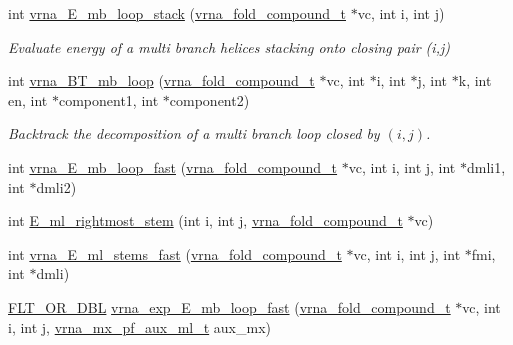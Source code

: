 \begin{DoxyCompactItemize}
int \mbox{\hyperlink{group__loops_ga73f048d35475e1d8f50b7d4ac6a2aeb6}{vrna\+\_\+\+E\+\_\+mb\+\_\+loop\+\_\+stack}} (\mbox{\hyperlink{group__fold__compound_ga1b0cef17fd40466cef5968eaeeff6166}{vrna\+\_\+fold\+\_\+compound\+\_\+t}} $\ast$vc, int i, int j)
\begin{DoxyCompactList}\small\item\em Evaluate energy of a multi branch helices stacking onto closing pair (i,j) \end{DoxyCompactList}\item 
int \mbox{\hyperlink{group__loops_ga9cb520ddfd8b3a48089a7910b045d06b}{vrna\+\_\+\+B\+T\+\_\+mb\+\_\+loop}} (\mbox{\hyperlink{group__fold__compound_ga1b0cef17fd40466cef5968eaeeff6166}{vrna\+\_\+fold\+\_\+compound\+\_\+t}} $\ast$vc, int $\ast$i, int $\ast$j, int $\ast$k, int en, int $\ast$component1, int $\ast$component2)
\begin{DoxyCompactList}\small\item\em Backtrack the decomposition of a multi branch loop closed by $ (i,j) $. \end{DoxyCompactList}\item 
int \mbox{\hyperlink{group__loops_gace56cf9c68e22ebfbeb4c04add4b03ca}{vrna\+\_\+\+E\+\_\+mb\+\_\+loop\+\_\+fast}} (\mbox{\hyperlink{group__fold__compound_ga1b0cef17fd40466cef5968eaeeff6166}{vrna\+\_\+fold\+\_\+compound\+\_\+t}} $\ast$vc, int i, int j, int $\ast$dmli1, int $\ast$dmli2)
\item 
int \mbox{\hyperlink{group__loops_gabe85e055e1e3245eaf108901473114ed}{E\+\_\+ml\+\_\+rightmost\+\_\+stem}} (int i, int j, \mbox{\hyperlink{group__fold__compound_ga1b0cef17fd40466cef5968eaeeff6166}{vrna\+\_\+fold\+\_\+compound\+\_\+t}} $\ast$vc)
\item 
int \mbox{\hyperlink{group__loops_ga806a455bf00a155dea7b0aa93d85c51b}{vrna\+\_\+\+E\+\_\+ml\+\_\+stems\+\_\+fast}} (\mbox{\hyperlink{group__fold__compound_ga1b0cef17fd40466cef5968eaeeff6166}{vrna\+\_\+fold\+\_\+compound\+\_\+t}} $\ast$vc, int i, int j, int $\ast$fmi, int $\ast$dmli)
\item 
\mbox{\hyperlink{group__data__structures_ga31125aeace516926bf7f251f759b6126}{F\+L\+T\+\_\+\+O\+R\+\_\+\+D\+BL}} \mbox{\hyperlink{group__loops_ga604313896e5f0ec91b6c44460707d036}{vrna\+\_\+exp\+\_\+\+E\+\_\+mb\+\_\+loop\+\_\+fast}} (\mbox{\hyperlink{group__fold__compound_ga1b0cef17fd40466cef5968eaeeff6166}{vrna\+\_\+fold\+\_\+compound\+\_\+t}} $\ast$vc, int i, int j, \mbox{\hyperlink{group__loops_ga39a8cc1385dcb542a60a9393cde6a1e3}{vrna\+\_\+mx\+\_\+pf\+\_\+aux\+\_\+ml\+\_\+t}} aux\+\_\+mx)

\end{DoxyCompactItemize}
